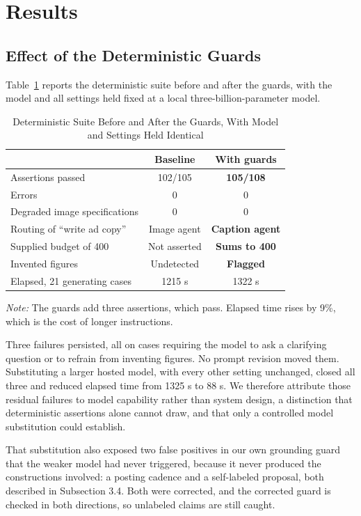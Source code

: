 \documentclass[9pt,twocolumn]{extarticle}
\newcommand{\tabref}[1]{Table~\ref{#1}}
\newcommand{\tabnote}[1]{\par\vspace{2pt}\footnotesize\textit{Note:} #1}
\begin{document}
\section{Results}

\subsection{Effect of the Deterministic Guards}
\tabref{tab:rq1} reports the deterministic suite before and after the guards,
with the model and all settings held fixed at a local three-billion-parameter
model.

\begin{table}[t]
\centering
\caption{Deterministic Suite Before and After the Guards, With Model and
Settings Held Identical}
\label{tab:rq1}
\small
\begin{tabular}{@{}lcc@{}}
\toprule
 & Baseline & With guards\\
\midrule
Assertions passed             & 102/105 & \textbf{105/108}\\
Errors                        & 0 & 0\\
Degraded image specifications & 0 & 0\\
Routing of ``write ad copy''  & Image agent & \textbf{Caption agent}\\
Supplied budget of 400        & Not asserted & \textbf{Sums to 400}\\
Invented figures              & Undetected & \textbf{Flagged}\\
Elapsed, 21 generating cases  & 1215 s & 1322 s\\
\bottomrule
\end{tabular}
\tabnote{The guards add three assertions, which pass. Elapsed time rises by
9\%, which is the cost of longer instructions.}
\end{table}

Three failures persisted, all on cases requiring the model to ask a clarifying
question or to refrain from inventing figures. No prompt revision moved them.
Substituting a larger hosted model, with every other setting unchanged, closed
all three and reduced elapsed time from 1325 s to 88 s. We therefore attribute
those residual failures to model capability rather than system design, a
distinction that deterministic assertions alone cannot draw, and that only a
controlled model substitution could establish.

That substitution also exposed two false positives in our own grounding guard
that the weaker model had never triggered, because it never produced the
constructions involved: a posting cadence and a self-labeled proposal, both
described in Subsection 3.4. Both were corrected, and the corrected guard is
checked in both directions, so unlabeled claims are still caught.
\end{document}
